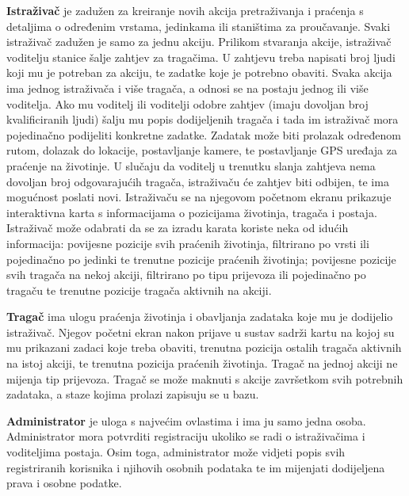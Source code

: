 		\textbf{Istraživač} je zadužen za kreiranje novih akcija pretraživanja i praćenja s detaljima o određenim vrstama, jedinkama ili staništima za proučavanje. Svaki istraživač zadužen je samo za jednu akciju. Prilikom stvaranja akcije, istraživač voditelju stanice šalje zahtjev za tragačima. U zahtjevu treba napisati broj ljudi koji mu je potreban za akciju, te zadatke koje je potrebno obaviti. Svaka akcija ima jednog istraživača i više tragača, a odnosi se na postaju jednog ili više voditelja. Ako mu voditelj ili voditelji odobre zahtjev (imaju dovoljan broj kvalificiranih ljudi) šalju mu popis dodijeljenih tragača i tada im istraživač mora pojedinačno podijeliti konkretne zadatke. Zadatak može biti prolazak određenom rutom, dolazak do lokacije, postavljanje kamere, te postavljanje GPS uređaja za praćenje na životinje.  U slučaju da voditelj u trenutku slanja zahtjeva nema dovoljan broj odgovarajućih tragača, istraživaču će zahtjev biti odbijen, te ima mogućnost poslati novi. Istraživaču se na njegovom početnom ekranu prikazuje interaktivna karta s informacijama o pozicijama životinja, tragača i postaja. Istraživač može odabrati da se za izradu karata koriste neka od idućih informacija: povijesne pozicije svih praćenih životinja, filtrirano po vrsti ili pojedinačno po jedinki te trenutne pozicije praćenih životinja; povijesne pozicije svih tragača na nekoj akciji, filtrirano po tipu prijevoza ili pojedinačno po tragaču te trenutne pozicije tragača aktivnih na akciji. \newline
		
		\textbf{Tragač} ima ulogu praćenja životinja i obavljanja zadataka koje mu je dodijelio istraživač. Njegov početni ekran nakon prijave u sustav sadrži kartu na kojoj su mu prikazani zadaci koje treba obaviti, trenutna pozicija ostalih tragača aktivnih na istoj akciji, te trenutna pozicija praćenih životinja. Tragač na jednoj akciji ne mijenja tip prijevoza. Tragač se može maknuti s akcije završetkom svih potrebnih zadataka, a staze kojima prolazi zapisuju se u bazu. \newline
		
		\textbf{Administrator} je uloga s najvećim ovlastima i ima ju samo jedna osoba. Administrator mora potvrditi registraciju ukoliko se radi o istraživačima i voditeljima postaja. Osim toga, administrator može vidjeti popis svih registriranih korisnika i njihovih osobnih podataka te im mijenjati dodijeljena prava i osobne podatke. \newline
		
